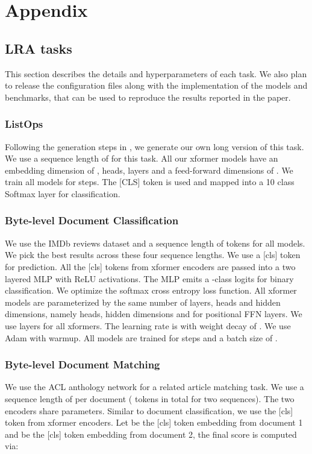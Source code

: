 \documentclass{article} \usepackage{iclr2021_conference,times}
\begin{document}


\newpage
\appendix
\section{Appendix}

\subsection{LRA tasks}
This section describes the details and hyperparameters of each task. We also plan to release the configuration files along with the implementation of the models and benchmarks, that can be used to reproduce the results reported in the paper.

\subsubsection{ListOps}
Following the generation steps in \citep{nangia2018listops}, we generate our own long version of this task. We use a sequence length of  for this task. All our xformer models have an embedding dimension of ,  heads,  layers and a feed-forward dimensions of . We train all models for  steps. The [CLS] token is used and mapped into a 10 class Softmax layer for classification. 

\subsubsection{Byte-level Document Classification} We use the IMDb reviews dataset \citep{maas-EtAl:2011:ACL-HLT2011} and a sequence length of  tokens for all models. We pick the best results across these four sequence lengths. We use a [cls] token for prediction. All the [cls] tokens from xformer encoders are passed into a two layered MLP with ReLU activations. The MLP emits a -class logits for binary classification. We optimize the softmax cross entropy loss function. All xformer models are parameterized by the same number of layers, heads and hidden dimensions, namely  heads,  hidden dimensions and  for positional FFN layers. We use  layers for all xformers. The learning rate is  with weight decay of . We use Adam with warmup. All models are trained for  steps and a batch size of .

\subsubsection{Byte-level Document Matching} We use the ACL anthology network for a related article matching task. We use a sequence length of  per document ( tokens in total for two sequences). The two encoders share parameters. Similar to document classification, we use the [cls] token from xformer encoders. Let  be the [cls] token embedding from document 1 and  be the [cls] token embedding from document 2, the final score is computed via:
\end{document}
